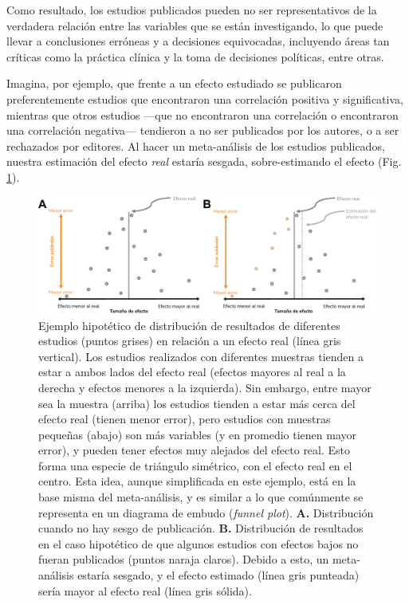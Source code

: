 \documentclass[
  bookmarksnumbered]{article}
\begin{document}
Como resultado, los estudios publicados pueden no ser representativos de la verdadera relación entre las variables que se están investigando, lo que puede llevar a conclusiones erróneas y a decisiones equivocadas, incluyendo áreas tan críticas como la práctica clínica y la toma de decisiones políticas, entre otras.

Imagina, por ejemplo, que frente a un efecto estudiado se publicaron preferentemente estudios que encontraron una correlación positiva y significativa, mientras que otros estudios ---que no encontraron una correlación o encontraron una correlación negativa--- tendieron a no ser publicados por los autores, o a ser rechazados por editores. Al hacer un meta-análisis de los estudios publicados, nuestra estimación del efecto \emph{real} estaría sesgada, sobre-estimando el efecto (Fig. \ref{fig:teoria-meta}).

\begin{figure}
\centering
\includegraphics{images/teoria-meta.pdf}
\caption{\label{fig:teoria-meta}Ejemplo hipotético de distribución de resultados de diferentes estudios (puntos grises) en relación a un efecto real (línea gris vertical). Los estudios realizados con diferentes muestras tienden a estar a ambos lados del efecto real (efectos mayores al real a la derecha y efectos menores a la izquierda). Sin embargo, entre mayor sea la muestra (arriba) los estudios tienden a estar más cerca del efecto real (tienen menor error), pero estudios con muestras pequeñas (abajo) son más variables (y en promedio tienen mayor error), y pueden tener efectos muy alejados del efecto real. Esto forma una especie de triángulo simétrico, con el efecto real en el centro. Esta idea, aunque simplificada en este ejemplo, está en la base misma del meta-análisis, y es similar a lo que comúnmente se representa en un diagrama de embudo (\textit{funnel plot}). \textbf{A.} Distribución cuando no hay sesgo de publicación. \textbf{B.} Distribución de resultados en el caso hipotético de que algunos estudios con efectos bajos no fueran publicados (puntos naraja claros). Debido a esto, un meta-análisis estaría sesgado, y el efecto estimado (línea gris punteada) sería mayor al efecto real (línea gris sólida).}
\end{figure}
\end{document}
